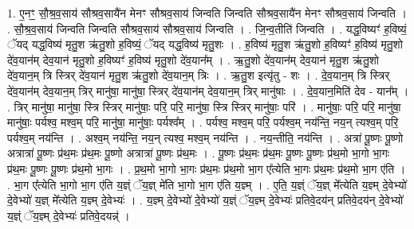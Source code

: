 \documentclass[17pt]{extarticle}
\begin{document}
1. ए॒नꣳ॒॒ सौ॒श्र॒व॒साय॑ सौश्रव॒सायै॑न मेनꣳ सौश्रव॒साय॑ जिन्वति जिन्वति सौश्रव॒सायै॑न मेनꣳ सौश्रव॒साय॑ जिन्वति । . सौ॒श्र॒व॒साय॑ जिन्वति जिन्वति सौश्रव॒साय॑ सौश्रव॒साय॑ जिन्वति । . जि॒न्व॒तीति॑ जिन्वति । . यद्ध॒विष्यꣳ॑ ह॒विष्यं॒ ॅयद् यद्ध॒विष्य॑ मृतु॒श ऋ॑तु॒शो ह॒विष्यं॒ ॅयद् यद्ध॒विष्य॑ मृतु॒शः । . ह॒विष्य॑ मृतु॒श ऋ॑तु॒शो ह॒विष्यꣳ॑ ह॒विष्य॑ मृतु॒शो दे॑व॒यान॑म् देव॒यान॑ मृतु॒शो ह॒विष्यꣳ॑ ह॒विष्य॑ मृतु॒शो दे॑व॒यान᳚म् । . ऋ॒तु॒शो दे॑व॒यान॑म् देव॒यान॑ मृतु॒श ऋ॑तु॒शो दे॑व॒यान॒म् त्रि स्त्रिर् दे॑व॒यान॑ मृतु॒श ऋ॑तु॒शो दे॑व॒यान॒म् त्रिः । . ऋ॒तु॒श इत्यृ॑तु - शः । . दे॒व॒यान॒म् त्रि स्त्रिर् दे॑व॒यान॑म् देव॒यान॒म् त्रिर् मानु॑षा॒ मानु॑षा॒ स्त्रिर् दे॑व॒यान॑म् देव॒यान॒म् त्रिर् मानु॑षाः । . दे॒व॒यान॒मिति॑ देव - यान᳚म् । . त्रिर् मानु॑षा॒ मानु॑षा॒ स्त्रि स्त्रिर् मानु॑षाः॒ परि॒ परि॒ मानु॑षा॒ स्त्रि स्त्रिर् मानु॑षाः॒ परि॑ । . मानु॑षाः॒ परि॒ परि॒ मानु॑षा॒ मानु॑षाः॒ पर्यश्व॒ मश्व॒म् परि॒ मानु॑षा॒ मानु॑षाः॒ पर्यश्व᳚म् । . पर्यश्व॒ मश्व॒म् परि॒ पर्यश्व॒म् नय॑न्ति॒ नय॒न् त्यश्व॒म् परि॒ पर्यश्व॒म् नय॑न्ति । . अश्व॒म् नय॑न्ति॒ नय॒न् त्यश्व॒ मश्व॒म् नय॑न्ति । . नय॒न्तीति॒ नय॑न्ति । . अत्रा॑ पू॒ष्णः पू॒ष्णो अत्रात्रा॑ पू॒ष्णः प्र॑थ॒मः प्र॑थ॒मः पू॒ष्णो अत्रात्रा॑ पू॒ष्णः प्र॑थ॒मः । . पू॒ष्णः प्र॑थ॒मः प्र॑थ॒मः पू॒ष्णः पू॒ष्णः प्र॑थ॒मो भा॒गो भा॒गः प्र॑थ॒मः पू॒ष्णः पू॒ष्णः प्र॑थ॒मो भा॒गः । . प्र॒थ॒मो भा॒गो भा॒गः प्र॑थ॒मः प्र॑थ॒मो भा॒ग ए᳚त्येति भा॒गः प्र॑थ॒मः प्र॑थ॒मो भा॒ग ए॑ति । . भा॒ग ए᳚त्येति भा॒गो भा॒ग ए॑ति य॒ज्ञ्ं ॅय॒ज्ञ् मे॑ति भा॒गो भा॒ग ए॑ति य॒ज्ञ्म् । . ए॒ति॒ य॒ज्ञ्ं ॅय॒ज्ञ् मे᳚त्येति य॒ज्ञ्म् दे॒वेभ्यो॑ दे॒वेभ्यो॑ य॒ज्ञ् मे᳚त्येति य॒ज्ञ्म् दे॒वेभ्यः॑ । . य॒ज्ञ्म् दे॒वेभ्यो॑ दे॒वेभ्यो॑ य॒ज्ञ्ं ॅय॒ज्ञ्म् दे॒वेभ्यः॑ प्रतिवे॒दय॑न् प्रतिवे॒दय॑न् दे॒वेभ्यो॑ य॒ज्ञ्ं ॅय॒ज्ञ्म् दे॒वेभ्यः॑ प्रतिवे॒दयन्न्॑ । \newline
\end{document}
